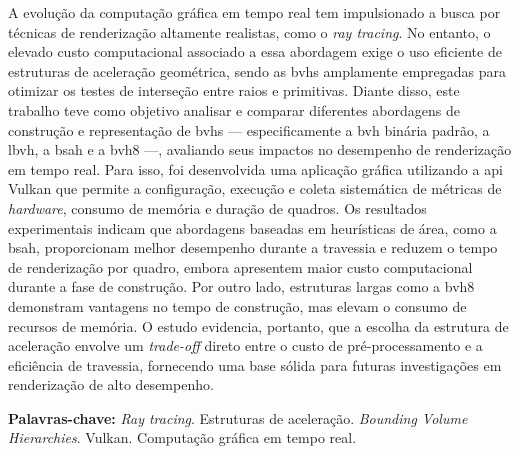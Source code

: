 \begin{resumo}
\noindent
A evolução da computação gráfica em tempo real tem impulsionado a busca por técnicas de renderização altamente realistas, como o \textit{ray tracing}. No entanto, o elevado custo computacional associado a essa abordagem exige o uso eficiente de estruturas de aceleração geométrica, sendo as \glspl{bvh} amplamente empregadas para otimizar os testes de interseção entre raios e primitivas. Diante disso, este trabalho teve como objetivo analisar e comparar diferentes abordagens de construção e representação de \glspl{bvh} --- especificamente a \gls{bvh} binária padrão, a \gls{lbvh}, a \gls{bsah} e a \gls{bvh8} ---, avaliando seus impactos no desempenho de renderização em tempo real. Para isso, foi desenvolvida uma aplicação gráfica utilizando a \gls{api} Vulkan que permite a configuração, execução e coleta sistemática de métricas de \textit{hardware}, consumo de memória e duração de quadros. Os resultados experimentais indicam que abordagens baseadas em heurísticas de área, como a \gls{bsah}, proporcionam melhor desempenho durante a travessia e reduzem o tempo de renderização por quadro, embora apresentem maior custo computacional durante a fase de construção. Por outro lado, estruturas largas como a \gls{bvh8} demonstram vantagens no tempo de construção, mas elevam o consumo de recursos de memória. O estudo evidencia, portanto, que a escolha da estrutura de aceleração envolve um \textit{trade-off} direto entre o custo de pré-processamento e a eficiência de travessia, fornecendo uma base sólida para futuras investigações em renderização de alto desempenho.

\vspace{0.2cm}   
\noindent\textbf{Palavras-chave:} \textit{Ray tracing}. Estruturas de aceleração. \textit{Bounding Volume Hierarchies}. Vulkan. Computação gráfica em tempo real.
\end{resumo}
 

